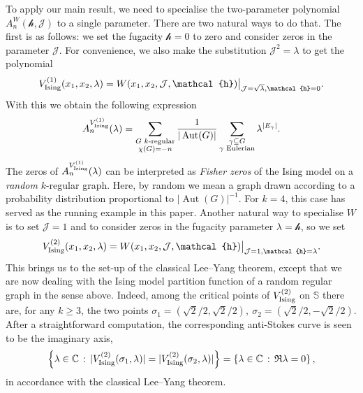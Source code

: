 \documentclass[11pt, a4paper]{article}
\numberwithin{theorem}{section}
\theoremstyle{remark}
\newcommand{\CC}{\mathbb{C}}
\DeclareMathOperator{\Aut}{Aut}
\newcommand{\J}{\mathcal{J}}
\newcommand{\h}{\mathcal{h}}
\renewcommand{\Re}{\mathfrak{R}}
\newcommand{\Sc}{\mathbb{S}}
\newcommand\restr[2]{{%
  \left.\kern-\nulldelimiterspace %
  #1 %
  \littletaller %
  \right|_{#2} %
  }}
\newcommand{\littletaller}{\mathchoice{\vphantom{\big|}}{}{}{}}
\theoremstyle{theorem}
\begin{document}
To apply our main result, we need to specialise the two-parameter polynomial $A_n^W(\h,\J)$ to a single parameter. There are two natural ways to do that. The first is as follows: we set the fugacity $\h=0$ to zero and consider zeros in the parameter $\J$. For convenience, we also make the substitution $\J^2 = \lambda$ to get the polynomial
\[
  V_{\rm Ising}^{(1)}(x_1,x_2,\lambda) = \restr{W(x_1,x_2,\J,\h)}{\J = \sqrt{\lambda},\h=0}.
\]
With this we obtain the following expression 
\[
  A_n^{V_{\rm Ising}^{(1)}}(\lambda) = \sum_{\substack{G \text{ $k$-regular} \\ \chi(G) = -n}} \frac{1}{|\Aut(G)|} \sum_{\substack{\gamma\subseteq G \\ \gamma \text{ Eulerian}}} \lambda^{|E_\gamma|}.
\]
The zeros of $A_n^{V_{\rm Ising}^{(1)}}(\lambda)$ can be interpreted as \emph{Fisher zeros} \cite{fisher1965lectures} of the Ising model on a \emph{random} $k$-regular graph. Here, by random we mean a graph drawn according to a probability distribution proportional to $|\Aut(G)|^{-1}$. For $k=4$, this case has served as the running example in this paper.
Another natural way to specialise $W$ is to set $\J=1$ and to consider zeros in the fugacity parameter $\lambda = \h$, so we set 
\[
  V_{\rm Ising}^{(2)}(x_1,x_2,\lambda) = \restr{W(x_1,x_2,\J,\h)}{\J = 1,\h=\lambda}.
\]
This brings us to the set-up of the classical Lee--Yang theorem, except that we are now dealing with the Ising model partition function of a random regular graph in the sense above. Indeed, among the critical points of $V_{\rm Ising}^{(2)}$ on $\Sc$ there are, for any $k\geq 3$, the two points $\sigma_1 = (\sqrt{2}/2, \sqrt{2}/2),~ \sigma_2 = (\sqrt{2}/2, -\sqrt{2}/2)$. After a straightforward computation, the corresponding anti-Stokes curve is seen to be the imaginary axis,
\[
  \left\{ \lambda\in\CC \,:\, |V_{\rm Ising}^{(2)}(\sigma_1,\lambda)| = |V_{\rm Ising}^{(2)}(\sigma_2,\lambda)| \right\} = \left\{ \lambda\in\CC \,:\, \Re \lambda = 0 \right\},
\]
in accordance with the classical Lee--Yang theorem.


\end{document}
